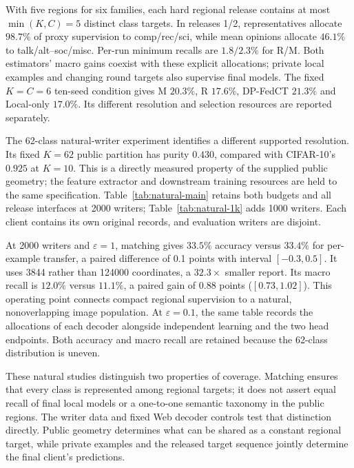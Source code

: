 With five regions for six families, each hard regional release contains at
most $\min(K,C)=5$ distinct class targets. In releases 1/2, representatives
allocate $98.7\%$ of proxy supervision to comp/rec/sci, while mean opinions
allocate $46.1\%$ to talk/alt--soc/misc. Per-run minimum recalls are
$1.8/2.3\%$ for R/M. Both estimators' macro gains coexist with these explicit
allocations; private local examples and changing round targets also supervise
final models. The fixed $K=C=6$ ten-seed condition gives M $20.3\%$, R
$17.6\%$, DP-FedCT $21.3\%$ and Local-only $17.0\%$.
Its different resolution and selection resources are reported separately.



The 62-class natural-writer experiment identifies a different supported
resolution. Its fixed $K=62$ public partition has purity $0.430$, compared
with CIFAR-10's $0.925$ at $K=10$. This is a directly measured property of
the supplied public geometry; the feature extractor and downstream training
resources are held to the same specification. Table~\ref{tab:natural-main}
retains both budgets and all release interfaces at 2000 writers;
Table~\ref{tab:natural-1k} adds 1000 writers. Each client contains its own
original records, and evaluation writers are disjoint.

At 2000 writers and $\varepsilon=1$, matching gives $33.5\%$ accuracy versus
$33.4\%$ for per-example transfer, a paired difference of 0.1 points with
interval $[-0.3,0.5]$. It uses 3844 rather than 124000 coordinates,
a $32.3\times$ smaller report. Its macro recall is $12.0\%$ versus $11.1\%$,
a paired gain of 0.88 points ($[0.73,1.02]$). This operating point connects
compact regional supervision to a natural, nonoverlapping image population.
At $\varepsilon=0.1$, the same table records the allocations of each decoder
alongside independent learning and the two head endpoints. Both accuracy and
macro recall are retained because the 62-class distribution is uneven.

These natural studies distinguish two properties of coverage. Matching
ensures that every class is represented among regional targets; it does not
assert equal recall of final local models or a one-to-one semantic taxonomy
in the public regions. The writer data and fixed Web decoder controls test
that distinction directly. Public geometry determines what can be shared as
a constant regional target, while private examples and the released target
sequence jointly determine the final client's predictions.

